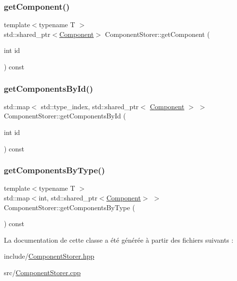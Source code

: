 \mbox{\label{classComponentStorer_a817c23e85158ef1fc49592ecd4a02b81}} 
\subsubsection{\texorpdfstring{get\+Component()}{getComponent()}}
{\footnotesize\ttfamily template$<$typename T $>$ \\
std\+::shared\+\_\+ptr$<$\hyperlink{structComponent}{Component}$>$ Component\+Storer\+::get\+Component (\begin{DoxyParamCaption}\item[{int}]{id }\end{DoxyParamCaption}) const\hspace{0.3cm}{\ttfamily [inline]}}

\mbox{\label{classComponentStorer_a32a2e59c11c6d4a73ecec277775225a2}} 
\subsubsection{\texorpdfstring{get\+Components\+By\+Id()}{getComponentsById()}}
{\footnotesize\ttfamily std\+::map$<$ std\+::type\+\_\+index, std\+::shared\+\_\+ptr$<$ \hyperlink{structComponent}{Component} $>$ $>$ Component\+Storer\+::get\+Components\+By\+Id (\begin{DoxyParamCaption}\item[{int}]{id }\end{DoxyParamCaption}) const}

\mbox{\label{classComponentStorer_abd4fb0cfe30b69e8102e52f66dc35c7a}} 
\subsubsection{\texorpdfstring{get\+Components\+By\+Type()}{getComponentsByType()}}
{\footnotesize\ttfamily template$<$typename T $>$ \\
std\+::map$<$int, std\+::shared\+\_\+ptr$<$\hyperlink{structComponent}{Component}$>$ $>$ Component\+Storer\+::get\+Components\+By\+Type (\begin{DoxyParamCaption}{ }\end{DoxyParamCaption}) const\hspace{0.3cm}{\ttfamily [inline]}}



La documentation de cette classe a été générée à partir des fichiers suivants \+:\begin{DoxyCompactItemize}
\item 
include/\hyperlink{ComponentStorer_8hpp}{Component\+Storer.\+hpp}\item 
src/\hyperlink{ComponentStorer_8cpp}{Component\+Storer.\+cpp}\end{DoxyCompactItemize}

